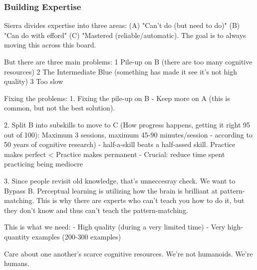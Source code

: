 \subsubsection{Building Expertise}
Sierra %
divides expertise into three areas:
(A) "Can't do (but need to do)"
(B) "Can do with efford"
(C) "Mastered (reliable/automatic).
The goal is to always moving this across this board.

But there are three main problems:
1 Pile-up on B (there are too many cognitive resources)
2 The Intermediate Blue (something has made it see it's not high quality)
3 Too slow

Fixing the problems:
1. Fixing the pile-up on B - Keep more on A (this is common, but not the best solution).

2. Split B into subskills to move to C (How progress happens, getting it right 95 out of 100): Maximum 3 sessions, maximum 45-90 minutes/session - according to 50 years of cognitive research) - half-a-skill beats a half-assed skill.
Practice makes perfect < Practice makes permanent
- Crucial: reduce time spent practicing being mediocre

3. Since people revisit old knowledge, that's unneccesray check. We want to Bypass B. Perceptual learning is utilizing how the brain is brilliant at pattern-matching. This is why there are experts who can't teach you how to do it, but they don't know and thus can't teach the pattern-matching.

This is what we need:
- High quality (during a very limited time)
- Very high-quantity examples (200-300 examples)

Care about one another's scarce cognitive resources. We're not humanoids. We're humans.